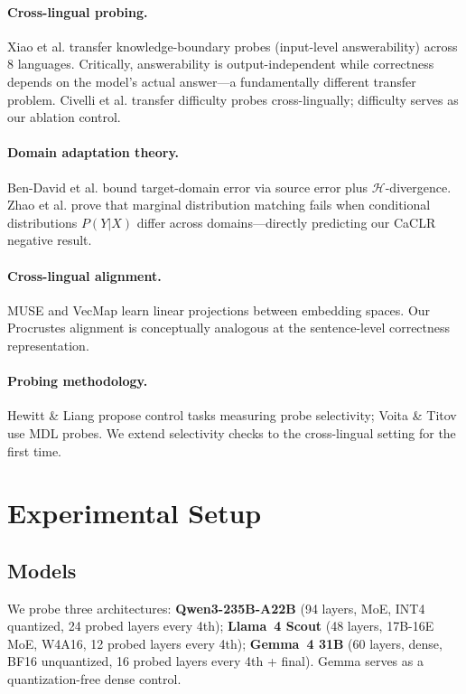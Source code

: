 \documentclass[11pt,a4paper]{article}
\begin{document}
\paragraph{Cross-lingual probing.}
Xiao et al. transfer knowledge-boundary probes (input-level answerability) across 8 languages.
Critically, answerability is output-independent while correctness depends on the model's actual answer---a fundamentally different transfer problem.
Civelli et al. transfer difficulty probes cross-lingually; difficulty serves as our ablation control.

\paragraph{Domain adaptation theory.}
Ben-David et al. bound target-domain error via source error plus $\mathcal{H}$-divergence.
Zhao et al. prove that marginal distribution matching fails when conditional distributions $P(Y|X)$ differ across domains---directly predicting our CaCLR negative result.

\paragraph{Cross-lingual alignment.}
MUSE and VecMap learn linear projections between embedding spaces.
Our Procrustes alignment is conceptually analogous at the sentence-level correctness representation.

\paragraph{Probing methodology.}
Hewitt \& Liang propose control tasks measuring probe selectivity; Voita \& Titov use MDL probes.
We extend selectivity checks to the cross-lingual setting for the first time.

\section{Experimental Setup}
\label{sec:setup}

\subsection{Models}
We probe three architectures:
\textbf{Qwen3-235B-A22B} (94 layers, MoE, INT4 quantized, 24 probed layers every 4th);
\textbf{Llama~4 Scout} (48 layers, 17B-16E MoE, W4A16, 12 probed layers every 4th);
\textbf{Gemma~4 31B} (60 layers, dense, BF16 unquantized, 16 probed layers every 4th + final).
Gemma serves as a quantization-free dense control.
\end{document}

